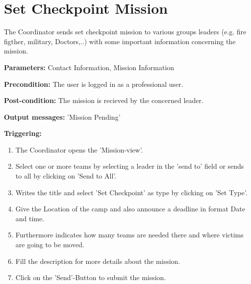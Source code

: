 \section{Set Checkpoint Mission}
\label{operation:CheckpointMission}
The Coordinator sends set checkpoint mission to various groups leaders (e.g.
fire figther, military, Doctors,..) with some important information concerning the
mission.\\
\begin{description}
\item \textbf{Parameters:} Contact Information, Mission Information
\item \textbf{Precondition:} The user is logged in as a professional user.
\item \textbf{Post-condition:} The mission is recieved by the concerned leader.
\item \textbf{Output messages:} 'Mission Pending'
\item \textbf{Triggering:}
\begin{enumerate}
\item The Coordinator opens the 'Mission-view'.
\item Select one or more teams by selecting a leader in the 'send to' field or
sends to all by clicking on 'Send to All'.
\item Writes the title and select 'Set Checkpoint' as type by clicking on 'Set
Type'.
\item Give the Location of the camp and also announce a deadline in format Date
and time.
\item Furthermore indicates how many teams are needed there and where victims
are going to be moved.
\item Fill the description for more details about the mission.
\item Click on the 'Send'-Button to submit the mission.
\end{enumerate}
\end{description} 

